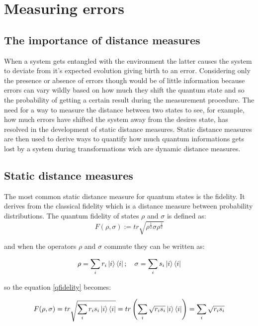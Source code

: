 \documentclass{article}
\begin{document}
\section{Measuring errors}

\subsection{The importance of distance measures}

When a system gets entangled with the environment the latter causes the system
to deviate from it's expected evolution giving birth to an error.
Considering only the presence or absence of errors though would be of little
information because errors can vary wildly based on how much they shift the
quantum state and so the probability of getting a certain result during
the measurement procedure.
The need for a way to measure the distance between two states to see, for example,
how much errors have shifted the system away from the desires state, has resolved
in the development of static distance measures.
Static distance measures are then used to derive ways to quantify how much quantum
informations gets lost by a system during transformations wich are dynamic distance
measures.


\subsection{Static distance measures}


The most common static distance measure for quantum states is the fidelity.
It derives from the classical fidelity which is a distance measure between
probability distributions.
The quantum fidelity of states $\rho$ and $\sigma$ is defined as:
\begin{equation}
	F(\rho,\sigma):=tr \sqrt{\rho^\frac{1}{2}\sigma\rho^\frac{1}{2}}
	\label{qfidelity}
\end{equation}

and when the operators $\rho$ and $\sigma$ commute they can be written as:

\begin {equation}
\rho = \sum_{i} r_i\ket{i}\bra{i}; \hspace{10pt} \sigma = \sum_{i} s_i \ket{i}\bra{i}
\end {equation}

so the equation \ref{qfidelity} becomes:

\begin{equation}
	F(\rho,\sigma) = tr \sqrt{\sum_{i} r_i s_i \ket{i}\bra{i} } = tr \left( \sum_{i} \sqrt{r_i s_i} \ket{i}\bra{i}
	\right) = \sum_{i}\sqrt{r_i s_i}
\end{equation}
\end{document}
